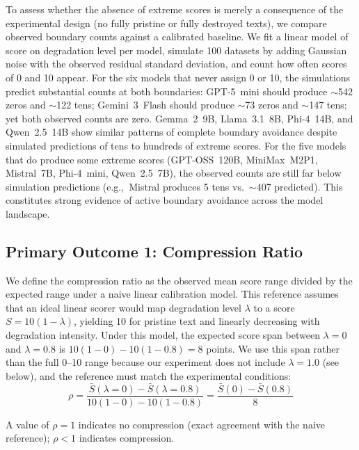 \documentclass[11pt]{article}
\newcommand{\eg}{e.g.,\ }
\begin{document}
To assess whether the absence of extreme scores is merely a consequence of the experimental design (no fully pristine or fully destroyed texts), we compare observed boundary counts against a calibrated baseline. We fit a linear model of score on degradation level per model, simulate 100 datasets by adding Gaussian noise with the observed residual standard deviation, and count how often scores of 0 and 10 appear. For the six models that never assign 0 or 10, the simulations predict substantial counts at both boundaries: GPT-5~mini should produce $\sim$542 zeros and $\sim$122 tens; Gemini~3~Flash should produce $\sim$73 zeros and $\sim$147 tens; yet both observed counts are zero. Gemma~2~9B, Llama~3.1~8B, Phi-4~14B, and Qwen~2.5~14B show similar patterns of complete boundary avoidance despite simulated predictions of tens to hundreds of extreme scores. For the five models that do produce some extreme scores (GPT-OSS~120B, MiniMax~M2P1, Mistral~7B, Phi-4~mini, Qwen~2.5~7B), the observed counts are still far below simulation predictions (\eg Mistral produces 5 tens vs.~$\sim$407 predicted). This constitutes strong evidence of active boundary avoidance across the model landscape.

\FloatBarrier
\subsection{Primary Outcome 1: Compression Ratio}

We define the compression ratio as the observed mean score range divided by the expected range under a naive linear calibration model. This reference assumes that an ideal linear scorer would map degradation level $\lambda$ to a score $S = 10(1 - \lambda)$, yielding 10 for pristine text and linearly decreasing with degradation intensity. Under this model, the expected score span between $\lambda = 0$ and $\lambda = 0.8$ is $10(1 - 0) - 10(1 - 0.8) = 8$ points. We use this span rather than the full 0--10 range because our experiment does not include $\lambda = 1.0$ (see below), and the reference must match the experimental conditions:
\begin{equation}
    \rho = \frac{\bar{S}(\lambda = 0) - \bar{S}(\lambda = 0.8)}{10(1 - 0) - 10(1 - 0.8)} = \frac{\bar{S}(0) - \bar{S}(0.8)}{8}
    \label{eq:compression}
\end{equation}

A value of $\rho = 1$ indicates no compression (exact agreement with the naive reference); $\rho < 1$ indicates compression.
\end{document}

